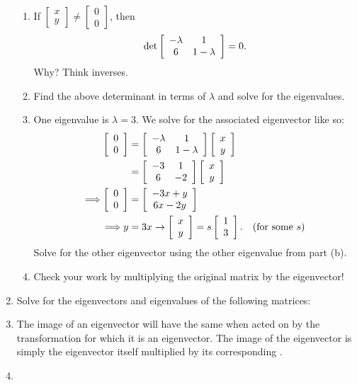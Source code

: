 \documentclass[../gatm.tex]{subfiles}
\begin{document}
\begin{enumerate}
\begin{enumerate}
\item If $\left[\begin{array}{c} x \\ y \end{array}\right]\neq\left[\begin{array}{c} 0 \\ 0 \end{array}\right]$, then $$\det \left[\begin{array}{cc} -\lambda & 1 \\ 6 & 1-\lambda \end{array}\right]=0.$$ Why? Think inverses.
\item Find the above determinant in terms of $\lambda$ and solve for the eigenvalues.
\item One eigenvalue is $\lambda=3$. We solve for the associated eigenvector like so:
\begin{align*}
\left[\begin{array}{c} 0 \\ 0 \end{array}\right] &= \left[\begin{array}{cc} -\lambda & 1 \\ 6 & 1-\lambda \end{array}\right]\left[\begin{array}{c} x \\ y \end{array}\right] \\
&= \left[\begin{array}{cc} -3 & 1 \\ 6 & -2 \end{array}\right]\left[\begin{array}{c} x \\ y \end{array}\right] \\
\Longrightarrow \left[\begin{array}{c} 0 \\ 0 \end{array}\right] &= \left[\begin{array}{c} -3x+y \\ 6x-2y \end{array}\right] \\
\Longrightarrow y&=3x \rightarrow \left[\begin{array}{c} x \\ y \end{array}\right]=s\left[\begin{array}{c} 1 \\ 3 \end{array}\right].\quad \text{(for some }s\text{)}
\end{align*}
Solve for the other eigenvector using the other eigenvalue from part (b).
\item Check your work by multiplying the original matrix by the eigenvector!
\end{enumerate}
\item Solve for the eigenvectors and eigenvalues of the following matrices:
\begin{enumerate}
\end{enumerate}
\item The image of an eigenvector will have the same \underline{\phantom{egg}} when acted on by the transformation \underline{\phantom{egg}} for which it is an eigenvector. The image of the eigenvector is simply the eigenvector itself multiplied by its corresponding \underline{\phantom{egg}}.
\item \begin{enumerate}

\end{enumerate}
\end{enumerate}
\end{document}
